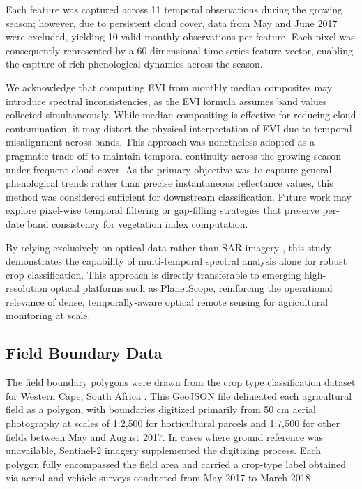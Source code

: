 \documentclass[pdflatex,sn-mathphys]{sn-jnl} %
\begin{document}
Each feature was captured across 11 temporal observations during the growing season; however, due to persistent cloud cover, data from May and June 2017 were excluded, yielding 10 valid monthly observations per feature. Each pixel was consequently represented by a 60-dimensional time-series feature vector, enabling the capture of rich phenological dynamics across the season.

We acknowledge that computing EVI from monthly median composites may introduce spectral inconsistencies, as the EVI formula assumes band values collected simultaneously. While median compositing is effective for reducing cloud contamination, it may distort the physical interpretation of EVI due to temporal misalignment across bands. This approach was nonetheless adopted as a pragmatic trade-off to maintain temporal continuity across the growing season under frequent cloud cover. As the primary objective was to capture general phenological trends rather than precise instantaneous reflectance values, this method was considered sufficient for downstream classification. Future work may explore pixel-wise temporal filtering or gap-filling strategies that preserve per-date band consistency for vegetation index computation.

By relying exclusively on optical data rather than SAR imagery \cite{sar2022}, this study demonstrates the capability of multi-temporal spectral analysis alone for robust crop classification. This approach is directly transferable to emerging high-resolution optical platforms such as PlanetScope, reinforcing the operational relevance of dense, temporally-aware optical remote sensing for agricultural monitoring at scale.

\subsection{Field Boundary Data}

The field boundary polygons were drawn from the crop type classification dataset for Western Cape, South Africa \cite{mlhub}. This GeoJSON file delineated each agricultural field as a polygon, with boundaries digitized primarily from 50 cm aerial photography at scales of 1:2,500 for horticultural parcels and 1:7,500 for other fields between May and August 2017. In cases where ground reference was unavailable, Sentinel-2 imagery supplemented the digitizing process. Each polygon fully encompassed the field area and carried a crop-type label obtained via aerial and vehicle surveys conducted from May 2017 to March 2018 \cite{mlhub}. 
\end{document}
